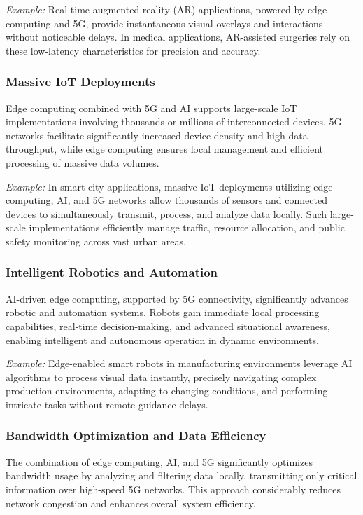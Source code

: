 \documentclass[runningheads]{llncs}
\begin{document}
\noindent\textit{Example:} Real-time augmented reality (AR) applications, powered by edge computing and 5G, provide instantaneous visual overlays and interactions without noticeable delays. In medical applications, AR-assisted surgeries rely on these low-latency characteristics for precision and accuracy.

\subsubsection{Massive IoT Deployments}
Edge computing combined with 5G and AI supports large-scale IoT implementations involving thousands or millions of interconnected devices. 5G networks facilitate significantly increased device density and high data throughput, while edge computing ensures local management and efficient processing of massive data volumes.

\noindent\textit{Example:} In smart city applications, massive IoT deployments utilizing edge computing, AI, and 5G networks allow thousands of sensors and connected devices to simultaneously transmit, process, and analyze data locally. Such large-scale implementations efficiently manage traffic, resource allocation, and public safety monitoring across vast urban areas.

\subsubsection{Intelligent Robotics and Automation}
AI-driven edge computing, supported by 5G connectivity, significantly advances robotic and automation systems. Robots gain immediate local processing capabilities, real-time decision-making, and advanced situational awareness, enabling intelligent and autonomous operation in dynamic environments.

\noindent\textit{Example:} Edge-enabled smart robots in manufacturing environments leverage AI algorithms to process visual data instantly, precisely navigating complex production environments, adapting to changing conditions, and performing intricate tasks without remote guidance delays.

\subsubsection{Bandwidth Optimization and Data Efficiency}
The combination of edge computing, AI, and 5G significantly optimizes bandwidth usage by analyzing and filtering data locally, transmitting only critical information over high-speed 5G networks. This approach considerably reduces network congestion and enhances overall system efficiency.
\end{document}
